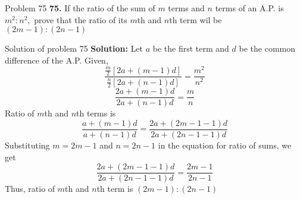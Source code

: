 \documentclass[aspectratio=169,8pt]{beamer}
\begin{document}
\begin{frame}{Problem 75}
  \textbf{75.} If the ratio of the sum of $m$ terms and $n$ terms of an A.P. is
  $m^2:n^2,$ prove that the ratio of its $m$th and $n$th term wil be $(2m -
  1):(2n -1)$
\end{frame}
\begin{frame}{Solution of problem 75}
  \textbf{Solution:} Let $a$ be the first term and $d$ be the common difference
  of the A.P. Given,
  $$\frac{\frac{m}{2}[2a + (m - 1)d]}{\frac{n}{2}[2a + (n - 1)d]} =
  \frac{m^2}{n^2}$$
  $$\frac{2a + (m - 1)d}{2a + (n - 1)d} = \frac{m}{n}$$
  Ratio of $m$th and $n$th terms is
  $$\frac{a + (m - 1)d}{a + (n - 1)d} = \frac{2a + (2m - 1 -1)d}{2a + (2n - 1 -
    1)d}$$
  Substituting $m = 2m -1$ and $n = 2n - 1$ in the equation for ratio of sums,
  we get
  $$\frac{2a + (2m - 1 - 1)d}{2a + (2n - 1 - 1)d} = \frac{2m - 1}{2n - 1}$$
  Thus, ratio of $m$th and $n$th term is $(2m - 1): (2n - 1)$
\end{frame}
\end{document}
